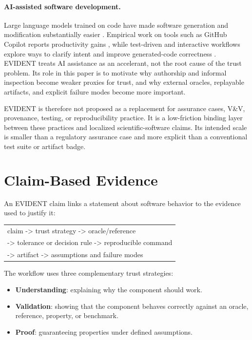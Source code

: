 \documentclass[10pt,twoside]{article}
\begin{document}
\paragraph{AI-assisted software development.}
Large language models trained on code have made software generation and
modification substantially easier \citep{chen_evaluating_2021}. Empirical work
on tools such as GitHub Copilot reports productivity gains
\citep{peng_impact_2023}, while test-driven and interactive workflows explore
ways to clarify intent and improve generated-code correctness
\citep{fakhoury2024ticoder}. EVIDENT treats AI assistance as an accelerant,
not the root cause of the trust problem. Its role in this paper is to motivate
why authorship and informal inspection become weaker proxies for trust, and why
external oracles, replayable artifacts, and explicit failure modes become more
important.

EVIDENT is therefore not proposed as a replacement for assurance cases, V\&V,
provenance, testing, or reproducibility practice. It is a low-friction binding
layer between these practices and localized scientific-software claims. Its
intended scale is smaller than a regulatory assurance case and more explicit
than a conventional test suite or artifact badge.

\section{Claim-Based Evidence}

An EVIDENT claim links a statement about software behavior to the evidence used
to justify it:

\begin{center}
\small\ttfamily
\begin{tabular}{l}
claim -> trust strategy -> oracle/reference \\
-> tolerance or decision rule -> reproducible command \\
-> artifact -> assumptions and failure modes
\end{tabular}
\end{center}

The workflow uses three complementary trust strategies:

\begin{itemize}[leftmargin=*]
  \item \textbf{Understanding}: explaining why the component should work.
  \item \textbf{Validation}: showing that the component behaves correctly
        against an oracle, reference, property, or benchmark.
  \item \textbf{Proof}: guaranteeing properties under defined assumptions.
\end{itemize}
\end{document}
